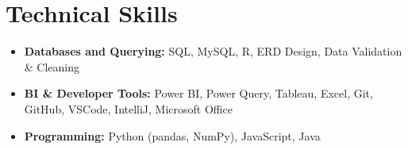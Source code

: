 \section{Technical Skills}



\vspace{-2pt}
\begin{itemize}[leftmargin=0.15in, label={}, itemsep=-3pt, topsep=0pt]
    \item \small{\textbf{Databases and Querying:} SQL, MySQL, R, ERD Design, Data Validation \& Cleaning}
    \item \small{\textbf{BI \& Developer Tools:} Power BI, Power Query, Tableau, Excel, Git, GitHub, VSCode, IntelliJ, Microsoft Office}
    \item \small{\textbf{Programming:} Python (pandas, NumPy), JavaScript, Java}
\end{itemize}
\vspace{-8pt}